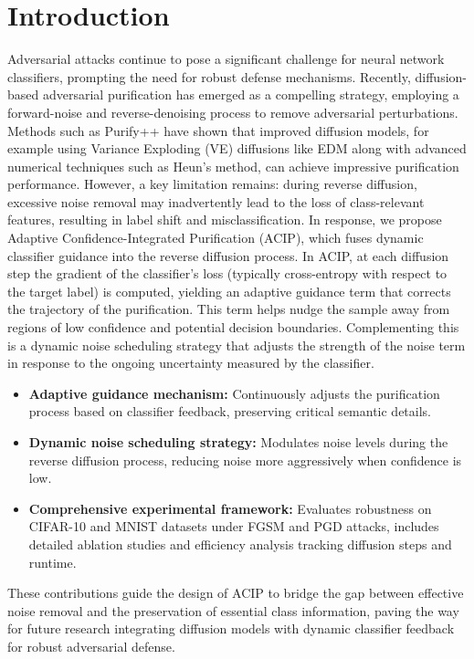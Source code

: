 \documentclass{article} %
\begin{document}
\section{Introduction}
\label{sec:intro}
Adversarial attacks continue to pose a significant challenge for neural network classifiers, prompting the need for robust defense mechanisms. Recently, diffusion-based adversarial purification has emerged as a compelling strategy, employing a forward-noise and reverse-denoising process to remove adversarial perturbations. Methods such as Purify++ have shown that improved diffusion models, for example using Variance Exploding (VE) diffusions\citep{Friedman2000a} like EDM\citep{Hutter2019} along with advanced numerical techniques such as Heun's method\citep{vanEngelen2019}, can achieve impressive purification performance. However, a key limitation remains: during reverse diffusion, excessive noise removal may inadvertently lead to the loss of class-relevant features, resulting in label shift and misclassification. In response, we propose Adaptive Confidence-Integrated Purification (ACIP), which fuses dynamic classifier guidance into the reverse diffusion process. In ACIP, at each diffusion step the gradient of the classifier's loss (typically cross-entropy with respect to the target label) is computed, yielding an adaptive guidance term that corrects the trajectory of the purification. This term helps nudge the sample away from regions of low confidence and potential decision boundaries. Complementing this is a dynamic noise scheduling strategy that adjusts the strength of the noise term in response to the ongoing uncertainty measured by the classifier.

\begin{itemize}
  \item \textbf{Adaptive guidance mechanism:} Continuously adjusts the purification process based on classifier feedback, preserving critical semantic details.
  \item \textbf{Dynamic noise scheduling strategy:} Modulates noise levels during the reverse diffusion process, reducing noise more aggressively when confidence is low.
  \item \textbf{Comprehensive experimental framework:} Evaluates robustness on CIFAR-10 and MNIST\citep{Arrieta2019} datasets under FGSM and PGD attacks\citep{Friedman2000b}, includes detailed ablation studies and efficiency analysis tracking diffusion steps and runtime.
\end{itemize}

These contributions guide the design of ACIP to bridge the gap between effective noise removal and the preservation of essential class information, paving the way for future research integrating diffusion models with dynamic classifier feedback for robust adversarial defense.
\end{document}
